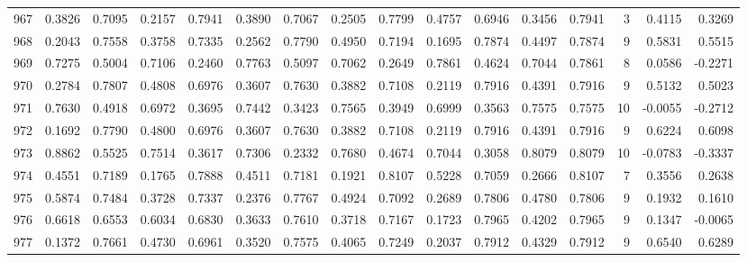 \begin{tabular}{lrrrrrrrrrrrrrrr}
967 &      0.3826 &  0.7095 &  0.2157 &  0.7941 &  0.3890 &  0.7067 &  0.2505 &  0.7799 &  0.4757 &  0.6946 &   0.3456 &     0.7941 &      3 &                    0.4115 &                     0.3269 \\
968 &      0.2043 &  0.7558 &  0.3758 &  0.7335 &  0.2562 &  0.7790 &  0.4950 &  0.7194 &  0.1695 &  0.7874 &   0.4497 &     0.7874 &      9 &                    0.5831 &                     0.5515 \\
969 &      0.7275 &  0.5004 &  0.7106 &  0.2460 &  0.7763 &  0.5097 &  0.7062 &  0.2649 &  0.7861 &  0.4624 &   0.7044 &     0.7861 &      8 &                    0.0586 &                    -0.2271 \\
970 &      0.2784 &  0.7807 &  0.4808 &  0.6976 &  0.3607 &  0.7630 &  0.3882 &  0.7108 &  0.2119 &  0.7916 &   0.4391 &     0.7916 &      9 &                    0.5132 &                     0.5023 \\
971 &      0.7630 &  0.4918 &  0.6972 &  0.3695 &  0.7442 &  0.3423 &  0.7565 &  0.3949 &  0.6999 &  0.3563 &   0.7575 &     0.7575 &     10 &                   -0.0055 &                    -0.2712 \\
972 &      0.1692 &  0.7790 &  0.4800 &  0.6976 &  0.3607 &  0.7630 &  0.3882 &  0.7108 &  0.2119 &  0.7916 &   0.4391 &     0.7916 &      9 &                    0.6224 &                     0.6098 \\
973 &      0.8862 &  0.5525 &  0.7514 &  0.3617 &  0.7306 &  0.2332 &  0.7680 &  0.4674 &  0.7044 &  0.3058 &   0.8079 &     0.8079 &     10 &                   -0.0783 &                    -0.3337 \\
974 &      0.4551 &  0.7189 &  0.1765 &  0.7888 &  0.4511 &  0.7181 &  0.1921 &  0.8107 &  0.5228 &  0.7059 &   0.2666 &     0.8107 &      7 &                    0.3556 &                     0.2638 \\
975 &      0.5874 &  0.7484 &  0.3728 &  0.7337 &  0.2376 &  0.7767 &  0.4924 &  0.7092 &  0.2689 &  0.7806 &   0.4780 &     0.7806 &      9 &                    0.1932 &                     0.1610 \\
976 &      0.6618 &  0.6553 &  0.6034 &  0.6830 &  0.3633 &  0.7610 &  0.3718 &  0.7167 &  0.1723 &  0.7965 &   0.4202 &     0.7965 &      9 &                    0.1347 &                    -0.0065 \\
977 &      0.1372 &  0.7661 &  0.4730 &  0.6961 &  0.3520 &  0.7575 &  0.4065 &  0.7249 &  0.2037 &  0.7912 &   0.4329 &     0.7912 &      9 &                    0.6540 &                     0.6289 \\

\end{tabular}
